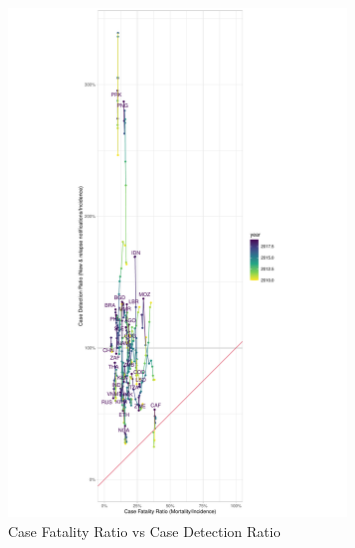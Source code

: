 \documentclass[12pt]{article}
\begin{document}
\FloatBarrier


\begin{figure}
\centering
\includegraphics[width=0.8\textwidth]{../plots/aF8.pdf}
\caption{Case Fatality Ratio vs Case Detection Ratio}
\end{figure}
\end{document}
